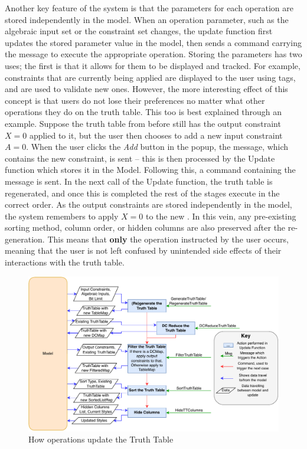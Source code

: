 Another key feature of the system is that the parameters for each operation are stored independently in the model. When an operation parameter, such as the algebraic input set or the constraint set changes, the update function first updates the stored parameter value in the model, then sends a command carrying the message to execute the appropriate operation.
Storing the parameters has two uses; the first is that it allows for them to be displayed and tracked. For example, constraints that are currently being applied are displayed to the user using tags, and are used to validate new ones. However, the more interesting effect of this concept is that users do not lose their preferences no matter what other operations they do on the truth table. This too is best explained through an example. Suppose the truth table from before still has the output constraint $X=0$ applied to it, but the user then chooses to add a new input constraint $A=0$. When the user clicks the \textit{Add} button in the popup, the  message, which contains the new constraint, is sent -- this is then processed by the Update function which stores it in the Model. Following this, a command containing the message  is sent.  In the next call of the Update function, the truth table is regenerated, and once this is completed the rest of the stages execute in the correct order. As the output constraints are stored independently in the model, the system remembers to apply $X=0$ to the new . In this vein, any pre-existing sorting method, column order, or hidden columns are also preserved after the re-generation. This means that \textbf{only} the operation instructed by the user occurs, meaning that the user is not left confused by unintended side effects of their interactions with the truth table.


\begin{figure}[h]
    \centering
    \includegraphics[width=\textwidth]{05.ImpPlan/tableoperations.pdf}
    \caption{How operations update the Truth Table}
    \label{fig:ttOps}
\end{figure}

